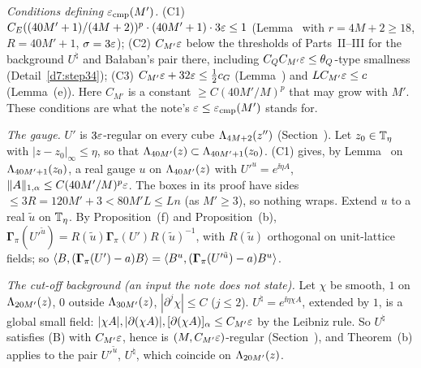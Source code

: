 \begin{detail}\label{d7:lc}
\emph{Conditions defining $\varepsilon_{\rm cmp}(M')$.} (C1) $C_E((40M'+1)/(4M+2))^p\cdot(40M'+1)\cdot3\varepsilon\le1$ (Lemma~ with $r=4M+2\ge18$, $R=40M'+1$, $\sigma=3\varepsilon$); (C2) $C_{M'}\varepsilon$ below the thresholds of Parts~II--III for the background $U^\natural$ and Ba\l aban's pair there, including $C_QC_{M'}\varepsilon\le\theta_Q$-type smallness (Detail~\ref{d7:step34}); (C3) $C_{M'}\varepsilon+32\varepsilon\le\frac12c_G$ (Lemma~) and $LC_{M'}\varepsilon\le c$ (Lemma~(e)). Here $C_{M'}$ is a constant $\ge C(40M'/M)^p$ that may grow with $M'$. These conditions are what the note's $\varepsilon\le\varepsilon_{\rm cmp}(M')$ stands for.
\begin{step}
\emph{The gauge.} $U'$ is $3\varepsilon$-regular on every cube $\Lambda_{4M+2}(z'')$ (Section~). Let $z_0\in\mathbb T_\eta$ with $|z-z_0|_\infty\le\eta$, so that $\Lambda_{40M'}(z)\subset\Lambda_{40M'+1}(z_0)$. (C1) gives, by Lemma~ on $\Lambda_{40M'+1}(z_0)$, a real gauge $u$ on $\Lambda_{40M'}(z)$ with $U'^u=e^{\ii\eta A}$, $\|A\|_{1,\alpha}\le C(40M'/M)^p\varepsilon$. The boxes in its proof have sides $\le3R=120M'+3<80M'L\le Ln$ (as $M'\ge3$), so nothing wraps. Extend $u$ to a real $\tilde u$ on $\mathbb T_\eta$. By Proposition~(f) and Proposition~(b), $\boldsymbol\Gamma_\pi(U'^{\tilde u})=R(\tilde u)\boldsymbol\Gamma_\pi(U')R(\tilde u)^{-1}$, with $R(\tilde u)$ orthogonal on unit-lattice fields; so $\langle B,(\boldsymbol\Gamma_\pi(U')-a)B\rangle=\langle B^u,(\boldsymbol\Gamma_\pi(U'^{\tilde u})-a)B^u\rangle$.
\end{step}
\begin{step}
\emph{The cut-off background (an input the note does not state).} Let $\chi$ be smooth, $1$ on $\Lambda_{20M'}(z)$, $0$ outside $\Lambda_{30M'}(z)$, $|\partial^j\chi|\le C$ ($j\le2$). $U^\natural=e^{\ii\eta\chi A}$, extended by $1$, is a global small field: $|\chi A|,|\partial(\chi A)|,[\partial(\chi A)]_\alpha\le C_{M'}\varepsilon$ by the Leibniz rule. So $U^\natural$ satisfies (B) with $C_{M'}\varepsilon$, hence is $(M,C_{M'}\varepsilon)$-regular (Section~), and Theorem~(b) applies to the pair $U'^{\tilde u}$, $U^\natural$, which coincide on $\Lambda_{20M'}(z)$.
\end{step}
\begin{step}

\end{step}
\end{detail}
